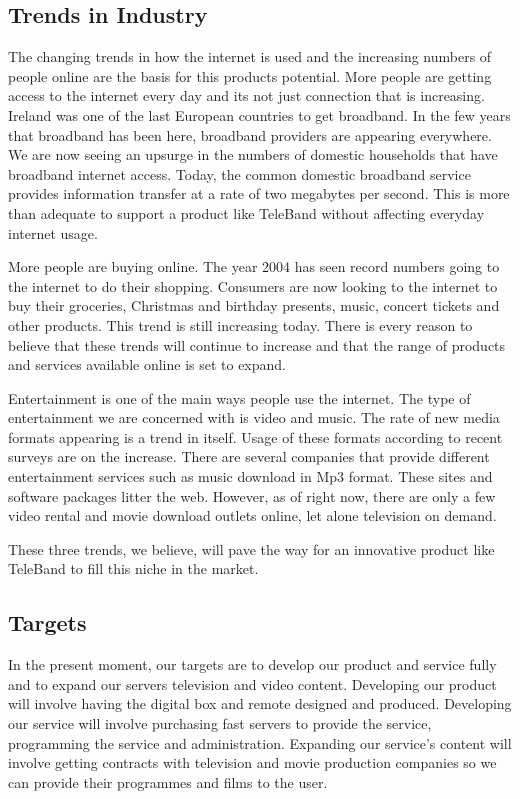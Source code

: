 \documentclass[a4paper,12pt]{article}
\begin{document}
\subsection{Trends in Industry}

The changing trends in how the internet is used and the increasing
numbers of people online are the basis for this products potential. More
people are getting access to the internet every day and its not just
connection that is increasing. Ireland was one of the last European
countries to get broadband. In the few years that broadband has been
here, broadband providers are appearing everywhere. We are now seeing an
upsurge in the numbers of domestic households that have broadband
internet access. Today, the common domestic broadband service provides
information transfer at a rate of two megabytes per second. This is more
than adequate to support a product like TeleBand without affecting
everyday internet usage.


More people are buying online. The year 2004 has seen record numbers
going to the internet to do their shopping. Consumers are now looking to
the internet to buy their groceries, Christmas and birthday presents,
music, concert tickets and other products. This trend is still
increasing today. There is every reason to believe that these trends
will continue to increase and that the range of products and services
available online is set to expand.


Entertainment is one of the main ways people use the internet. The type
of entertainment we are concerned with is video and music. The rate of
new media formats appearing is a trend in itself. Usage of these formats
according to recent surveys are on the increase. There are several
companies that provide different entertainment services such as music
download in Mp3 format. These sites and software packages litter the
web. However, as of right now, there are only a few video rental and
movie download outlets online, let alone television on demand. 


These three trends, we believe, will pave the way for an innovative
product like TeleBand to fill this niche in the market. 


\subsection{Targets}

In the present moment, our targets are to develop our product and
service fully and to expand our servers television and video content.
Developing our product will involve having the digital box and remote
designed and produced. Developing our service will involve purchasing
fast servers to provide the service, programming the service and
administration. Expanding our service's content will involve getting
contracts with television and movie production companies so we can
provide their programmes and films to the user.
\end{document}
